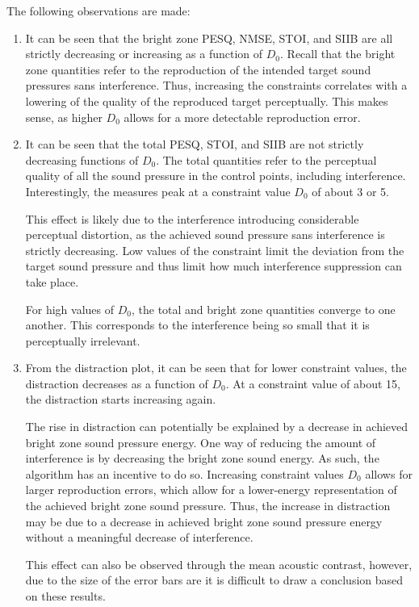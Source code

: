 The following observations are made:
\begin{enumerate}
    \item It can be seen that the bright zone PESQ, NMSE, STOI, and SIIB are all strictly decreasing or increasing as a 
        function of $D_0$.
        Recall that the bright zone quantities refer to the reproduction of the intended target sound pressures sans 
        interference.
        Thus, increasing the constraints correlates with a lowering of the quality of the reproduced target
        perceptually.
        This makes sense, as higher $D_0$ allows for a more detectable reproduction error. 
        \label{obs:constrained:1}

    \item It can be seen that the total PESQ, STOI, and SIIB are not strictly decreasing functions of $D_0$.
        The total quantities refer to the perceptual quality of all the sound pressure in the control points,
        including interference.
        Interestingly, the measures peak at a constraint value $D_0$ of about 3 or 5. 

        This effect is likely due to the interference introducing considerable perceptual distortion,
        as the achieved sound pressure sans interference is strictly decreasing.
        Low values of the constraint limit the deviation from the target sound pressure and thus limit how much interference suppression can take place.

        For high values of $D_0$, the total and bright zone quantities converge to one another.
        This corresponds to the interference being so small that it is perceptually irrelevant.
        \label{obs:constrained:2}

    \item From the distraction plot, it can be seen that for lower constraint values, the distraction decreases as a function of $D_0$.
        At a constraint value of about 15, the distraction starts increasing again.

        The rise in distraction can potentially be explained by a decrease in achieved bright zone sound pressure energy.
        One way of reducing the amount of interference is by decreasing the bright zone sound energy.
        As such, the algorithm has an incentive to do so.
        Increasing constraint values $D_0$ allows for larger reproduction errors, which allow for a lower-energy
        representation of the achieved bright zone sound pressure.
        Thus, the increase in distraction may be due to a decrease in achieved bright zone sound pressure energy without
        a meaningful decrease of interference.

        This effect can also be observed through the mean acoustic contrast, however, due to the size of the error bars are 
        it is difficult to draw a conclusion based on these results.
        \label{obs:constrained:3}
\end{enumerate}
